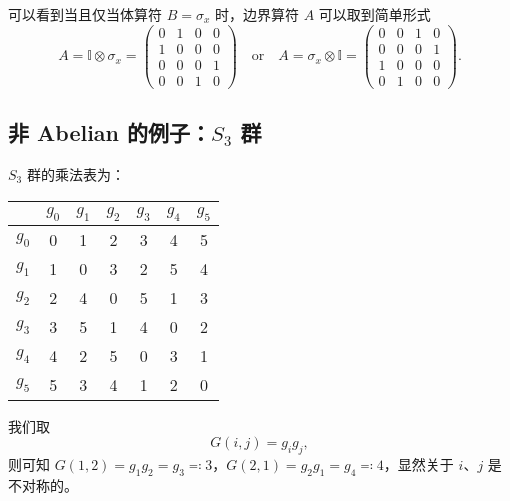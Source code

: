 可以看到当且仅当体算符 $B=\sigma_x$ 时，边界算符 $A$ 可以取到简单形式
\begin{equation}
  A = \mathbb{I} \otimes \sigma_x = \begin{pmatrix}
    0 & 1 & 0 & 0 \\
    1 & 0 & 0 & 0 \\
    0 & 0 & 0 & 1 \\
    0 & 0 & 1 & 0
  \end{pmatrix}
  \quad \text{or} \quad
  A = \sigma_x \otimes \mathbb{I} = \begin{pmatrix}
    0 & 0 & 1 & 0 \\
    0 & 0 & 0 & 1 \\
    1 & 0 & 0 & 0 \\
    0 & 1 & 0 & 0
  \end{pmatrix}.
\end{equation}

\subsection{非 Abelian 的例子：\texorpdfstring{$S_3$}{𝑆₃} 群}

$S_3$ 群的乘法表为：
\begin{center}
  \begin{tabular}{c|cccccc}
    & $g_0$ & $g_1$ & $g_2$ & $g_3$ & $g_4$ & $g_5$ \\
    \hline
    $g_0$ & 0 & 1 & 2 & 3 & 4 & 5 \\
    $g_1$ & 1 & 0 & 3 & 2 & 5 & 4 \\
    $g_2$ & 2 & 4 & 0 & 5 & 1 & 3 \\
    $g_3$ & 3 & 5 & 1 & 4 & 0 & 2 \\
    $g_4$ & 4 & 2 & 5 & 0 & 3 & 1 \\
    $g_5$ & 5 & 3 & 4 & 1 & 2 & 0 \\
  \end{tabular}
\end{center}
我们取
\begin{equation}
  G(i,j) = g_i g_j,
\end{equation}
则可知 $G(1,2)=g_1 g_2=g_3\eqcolon3$，$G(2,1)=g_2 g_1=g_4\eqcolon4$，显然关于 $i$、$j$ 是不对称的。



